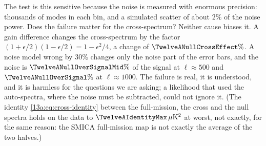 The test is this sensitive because the noise is measured with enormous precision: thousands of modes in each bin, and a
simulated scatter of about $2\%$ of the noise power. Does the failure matter for the cross-spectrum? Neither cause biases
it. A gain difference changes the cross-spectrum by the factor $(1+\epsilon/2)(1-\epsilon/2)=1-\epsilon^2/4$, a change of
$\TwelveANullCrossEffect\%$. A noise model wrong by $30\%$ changes only the noise part of the error bars, and the noise is
$\TwelveANullOverSignalMid\%$ of the signal at $\ell\approx500$ and $\TwelveANullOverSignal\%$ at $\ell\approx1000$. The failure is real,
it is understood, and it is harmless for the questions we are asking; a likelihood that used the auto-spectra, where the noise
must be subtracted, could not ignore it. (The identity \eqref{13a:eq:cross-identity} between the full-mission, the cross and the
null spectra holds on the data to $\TwelveAIdentityMax\,\mu{\rm K}^2$ at worst, not exactly, for the same reason: the SMICA full-mission
map is not exactly the average of the two halves.)

